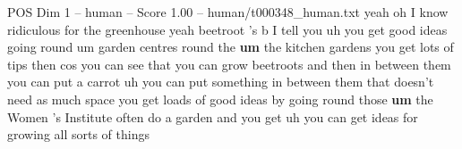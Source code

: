 \begin{textsample}{POS Dim 1 – human – Score 1.00 – human/t000348\_human.txt}  \label{ex:f1_pos_005}
yeah oh I know ridiculous for the greenhouse yeah beetroot 's b I tell you uh you get good ideas going round um garden centres round the \textbf{um} the kitchen gardens you get lots of tips then cos you can see that you can grow beetroots and then in between them you can put a carrot uh you can put something in between them that doesn't need as much space you get loads of good ideas by going round those \textbf{um} the Women 's Institute often do a garden and you get uh you can get ideas for growing all sorts of things

\end{textsample}

